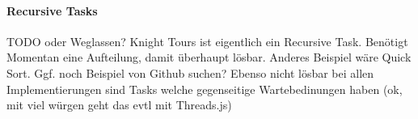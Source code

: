 \paragraph{Recursive Tasks}
TODO oder Weglassen? Knight Tours ist eigentlich ein Recursive Task. Benötigt Momentan eine Aufteilung, damit überhaupt lösbar. Anderes Beispiel wäre Quick Sort. Ggf. noch Beispiel von Github suchen? Ebenso nicht lösbar bei allen Implementierungen sind Tasks welche gegenseitige Wartebedinungen haben (ok, mit viel würgen geht das evtl mit Threads.js)
